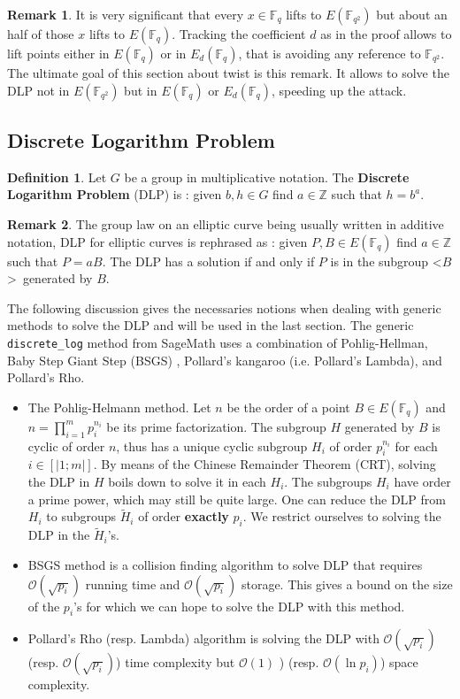 \documentclass[10pt]{article}
\theoremstyle{definition}
\newtheorem{definition}{Definition}
\newtheorem{remark}{Remark}
\newcommand{\F}{\mathbb{F}}
\newcommand{\Z}{\mathbb{Z}}
\begin{document}
\begin{remark}
It is very significant that every $x \in \F_q$ lifts to $E(\F_{q^2})$ but about an half of those $x$ lifts to $E(\F_q)$.
Tracking the coefficient $d$ as in the proof allows to lift points either in $E(\F_q)$ or in $E_d(\F_q)$, that is avoiding any reference to $\F_{q^2}$.
The ultimate goal of this section about twist is this remark.
It allows to solve the DLP not in $E(\F_{q^2})$ but in $E(\F_q)$ or $E_d(\F_q)$, speeding up the attack.
\end{remark}

\subsection{Discrete Logarithm Problem}

\begin{definition}
Let $G$ be a group in multiplicative notation.
The \textbf{Discrete Logarithm Problem} (DLP) is : given $b,h \in G$ find $a \in \Z$ such that $h = b^a$.
\end{definition}

\noindent \begin{remark}
The group law on an elliptic curve being usually written in additive notation, DLP for elliptic curves is rephrased as : given $P,B \in E(\F_q)$ find $a \in \Z$ such that $P = aB$.
The DLP has a solution if and only if $P$ is in the subgroup \textless$B$\textgreater~generated by $B$.
\end{remark}

The following discussion gives the necessaries notions when dealing with generic methods to solve the DLP and will be used in the last section.
The generic \verb|discrete_log| method from SageMath uses a combination of Pohlig-Hellman, Baby Step Giant Step (BSGS) , Pollard’s kangaroo (i.e. Pollard's Lambda), and Pollard’s Rho. 

\begin{itemize}
\item The Pohlig-Helmann method.
Let $n$ be the order of a point $B \in E(\F_q)$ and  $n = \prod_{i = 1}^m p_i^{n_i}$ be its prime factorization.
The subgroup $H$ generated by $B$ is cyclic of order $n$, thus has a unique cyclic subgroup $H_i$ of order $p_i^{n_i}$ for each $i \in [| 1; m|]$.
By means of the Chinese Remainder Theorem (CRT), solving the DLP in $H$ boils down to solve it in each $H_i$. 
The subgroups $H_i$ have order a prime power, which may still be quite large. 
One can reduce the DLP from $H_i$ to subgroups $\tilde{H}_i$ of order \textbf{exactly} $p_i$.
We restrict ourselves to solving the DLP in the $\tilde{H}_i$'s.
\item BSGS method is a collision finding algorithm to solve DLP that requires $\mathcal{O}(\sqrt{p_i})$ running time and $\mathcal{O}(\sqrt{p_i})$ storage.
This gives a bound on the size of the $p_i$'s for which we can hope to solve the DLP with this method.
\item Pollard's Rho (resp. Lambda) algorithm is solving the DLP with $\mathcal{O}(\sqrt{p_i})$ (resp. $\mathcal{O}(\sqrt{p_i})$) time complexity but $\mathcal{O}(1)$ ) (resp. $\mathcal{O}(\ln{p_i})$) space complexity.
\end{itemize}
\end{document}
